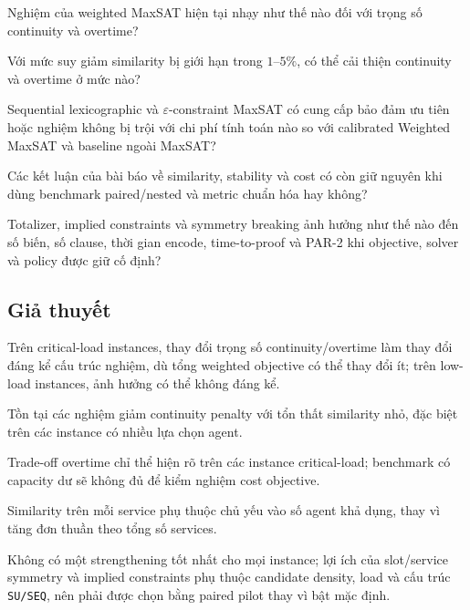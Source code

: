 \documentclass[12pt,a4paper]{article}
\begin{document}
\begin{description}[leftmargin=3.4em,labelwidth=2.8em]
  \item[RQ1.] Nghiệm của weighted MaxSAT hiện tại nhạy như thế nào đối với
              trọng số continuity và overtime?
  \item[RQ2.] Với mức suy giảm similarity bị giới hạn trong $1$--$5\%$, có thể
              cải thiện continuity và overtime ở mức nào?
  \item[RQ3.] Sequential lexicographic và $\varepsilon$-constraint MaxSAT có
              cung cấp bảo đảm ưu tiên hoặc nghiệm không bị trội với chi phí
              tính toán nào so với calibrated Weighted MaxSAT và baseline
              ngoài MaxSAT?
  \item[RQ4.] Các kết luận của bài báo về similarity, stability và cost có còn
              giữ nguyên khi dùng benchmark paired/nested và metric chuẩn hóa
              hay không?
  \item[RQ5.] Totalizer, implied constraints và symmetry breaking ảnh hưởng như
              thế nào đến số biến, số clause, thời gian encode, time-to-proof và
              PAR-2 khi objective, solver và policy được giữ cố định?
\end{description}

\subsection{Giả thuyết}

\begin{description}[leftmargin=3.4em,labelwidth=2.8em]
  \item[H1.] Trên critical-load instances, thay đổi trọng số
             continuity/overtime làm thay đổi đáng kể cấu trúc nghiệm, dù tổng
             weighted objective có thể thay đổi ít; trên low-load instances,
             ảnh hưởng có thể không đáng kể.
  \item[H2.] Tồn tại các nghiệm giảm continuity penalty với tổn thất similarity
             nhỏ, đặc biệt trên các instance có nhiều lựa chọn agent.
  \item[H3.] Trade-off overtime chỉ thể hiện rõ trên các instance critical-load;
             benchmark có capacity dư sẽ không đủ để kiểm nghiệm cost objective.
  \item[H4.] Similarity trên mỗi service phụ thuộc chủ yếu vào số agent khả dụng,
             thay vì tăng đơn thuần theo tổng số services.
  \item[H5.] Không có một strengthening tốt nhất cho mọi instance; lợi ích của
             slot/service symmetry và implied constraints phụ thuộc candidate
             density, load và cấu trúc \texttt{SU/SEQ}, nên phải được chọn bằng paired
             pilot thay vì bật mặc định.
\end{description}
\end{document}

